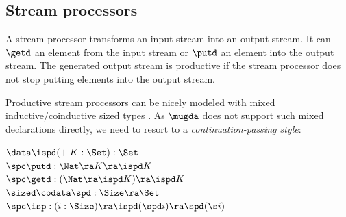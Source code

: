 \subsection{Stream processors}

A stream processor \cite{journals/entcs/GhaniHP06} transforms an input stream into an output stream.
It can $\getd$ an element from the input stream or $\putd$ an element into the output stream.
The generated output stream is productive if the stream processor does not stop putting elements into the output stream.

Productive stream processors can be nicely modeled with mixed in\-ductive/coinductive sized types \cite{abel:aplas07}. 
As $\mugda$ does not support such mixed declarations directly, we need to resort to a \emph{continuation-passing style}:
\begin{bsp}
$\data \ispd ( + \: K : \Set) : \Set$\\
$\spc \putd : \Nat \ra K \ra \ispd K$ \\
$\spc \getd : (\Nat \ra \ispd K) \ra \ispd K $ \\

$\sized \codata \spd : \Size \ra \Set$\\
$\spc \isp : (i : \Size) \ra \ispd (\spd i) \ra \spd (\s i)$
\end{bsp}

